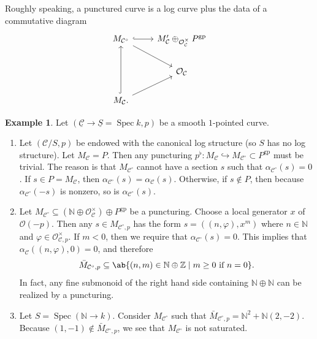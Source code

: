 \documentclass{amsart}
\theoremstyle{definition}
\newtheorem{exm}[thm]{Example}
\theoremstyle{remark}
\theoremstyle{plain}
\theoremstyle{definition}
\theoremstyle{remark}
\newcommand{\N}{\mathbb{N}}
\newcommand{\Z}{\mathbb{Z}}
\newcommand{\mc}[1]{\mathcal{#1}}
\newcommand{\on}[1]{\operatorname{#1}}
\newcommand{\ul}[1]{\underline{#1}}
\newcommand{\1}{\mathbf{1}}
\newcommand{\2}{\mathbf{2}}
\newcommand{\3}{\mathbf{3}}
\DeclareMathOperator{\Spec}{Spec}
\begin{document}
Roughly speaking, a punctured curve is a log curve plus the data of a commutative diagram
\begin{equation*}
\begin{tikzcd}
    M_{\mc{C}^{\circ}} \ar{dr} \ar[hookrightarrow]{r} & M_{\mc{C}}' \oplus_{\mc{O}_{\mc{C}}^{\times}} P^{\on{gp}} \\
    & \mc{O}_{\mc{C}} \\
    M_{\mc{C}} \ar[hookrightarrow]{uu} \ar{ur}.
\end{tikzcd}
\end{equation*}


\begin{exm}
    Let \((\ul{\mc{C}} \to \ul{S} = \Spec k, p)\) be a smooth \(1\)-pointed curve.
    \begin{enumerate}
        \item Let \((\mc{C}/S, p)\) be endowed with the canonical log structure (so \(S\) has no log structure). Let \(M_{\mc{C}} = P\). Then any puncturing \(p^{\flat} \colon M_{\mc{C}} \hookrightarrow M_{\mc{C}^{\circ}} \subset P^{\on{gp}}\) must be trivial. The reason is that \(M_{\mc{C}^{\circ}}\) cannot have a section \(s\) such that \(\alpha_{\mc{C}^{\circ}}(s) = 0\). If \(s \in P = M_{\mc{C}}\), then \(\alpha_{\mc{C}^{\circ}}(s) = \alpha_{\mc{C}}(s)\). Otherwise, if \(s \notin P\), then because \(\alpha_{\mc{C}^{\circ}}(-s)\) is nonzero, so is \(\alpha_{\mc{C}^{\circ}}(s)\).
        \item Let \(M_{\mc{C}^{\circ}} \subseteq (\N \oplus \mc{O}_{\mc{C}}^{\times}) \oplus P^{\on{gp}}\) be a puncturing. Choose a local generator \(x\)  of \(\mc{O}(-p)\). Then any \(s \in M_{\mc{C}^{\circ}, p}\) has the form \(s = ((n, \varphi), x^m)\) where \(n \in \N\) and \(\varphi \in \mc{O}_{\mc{C}, p}^{\times}\). If \(m < 0\), then we require that \(\alpha_{\mc{C}^{\circ}}(s) = 0\). This implies that \(\alpha_{\mc{C}}((n, \varphi), 0) = 0\), and therefore
            \[ \bar{M}_{\mc{C}^{\circ}, p} \subseteq \ab\{(n, m) \in \N \oplus \Z \mid m \geq 0 \text{ if } n = 0 \}. \]
            In fact, any fine submonoid of the right hand side containing \(\N \oplus \N\) can be realized by a puncturing.
        \item Let \(S = \Spec(\N \to k)\). Consider \(M_{\mc{C}^{\circ}}\) such that \(\bar{M}_{\mc{C}^{\circ}, p} = \N^2 + \N (2,-2)\). Because \((1,-1) \notin \bar{M}_{\mc{C}^{\circ}, p}\), we see that \(M_{\mc{C}^{\circ}}\) is not saturated.
    \end{enumerate}
\end{exm}
\end{document}
